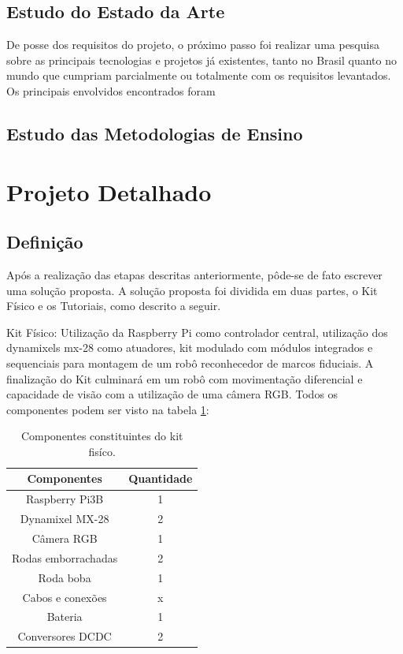 \subsection{Estudo do Estado da Arte}
De posse dos requisitos do projeto, o próximo passo foi realizar uma pesquisa sobre as principais tecnologias e projetos já existentes, tanto no Brasil quanto no mundo que cumpriam parcialmente ou totalmente com os requisitos levantados. Os principais envolvidos encontrados foram 
\subsection{Estudo das Metodologias de Ensino}

\section{Projeto Detalhado}
\subsection{Definição}
Após a realização das etapas descritas anteriormente, pôde-se de fato escrever uma solução proposta. A solução proposta foi dividida em duas partes, o Kit Físico e os Tutoriais, como descrito a seguir.

Kit Físico: Utilização da Raspberry Pi como controlador central, utilização dos dynamixels mx-28 como atuadores, kit modulado com módulos integrados e sequenciais para montagem de um robô reconhecedor de marcos fiduciais. A finalização do Kit culminará em um robô com movimentação diferencial e capacidade de visão com a utilização de uma câmera RGB. Todos os componentes podem ser  visto na tabela \ref{Tabela1}:

\begin{table}
	\centering
	\begin{small}
		\caption{Componentes constituintes do kit fisíco.} \label{Tabela1}
		\begin{tabular}{cc}
			\hline
			Componentes              & Quantidade\\
			\hline
			Raspberry Pi3B              & 1 \\
			Dynamixel MX-28                & 2 \\
			Câmera RGB                    & 1 \\
			Rodas emborrachadas            & 2 \\
			Roda boba                    & 1 \\
			Cabos e conexões            & x \\
			Bateria                     & 1 \\
			Conversores DCDC            & 2 \\
			\hline
		\end{tabular}
	\end{small}
\end{table}

